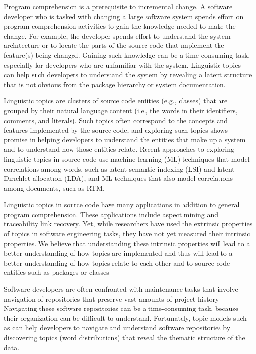 Program comprehension is a prerequisite to incremental change. A
software developer who is tasked with changing a large software system
spends effort on program comprehension activities to gain the knowledge
needed to make the change. For example, the developer
spends effort to understand the system architecture or to locate the
parts of the source code that implement the feature(s) being changed.
Gaining such knowledge can be a time-consuming task, especially for
developers who are unfamiliar with the system. Linguistic topics can
help such developers to understand the system by revealing a latent
structure that is not obvious from the package hierarchy or system
documentation.

Linguistic topics are clusters of source code entities (e.g., classes)
that are grouped by their natural language content (i.e., the words in
their identifiers, comments, and literals). Such topics often correspond
to the concepts and features implemented by the source
code, and exploring such topics shows promise in
helping developers to understand the entities that make up a system and
to understand how those entities
relate.
Recent approaches to exploring linguistic topics in source code use
machine learning (ML) techniques that model correlations among words,
such as latent semantic indexing (LSI) and
latent Dirichlet allocation (LDA), and ML techniques
that also model correlations among documents, such as
RTM.

Linguistic topics in source code have many applications in addition to
general program comprehension. These applications include aspect
mining and traceability link
recovery. Yet, while researchers have used the
extrinsic properties of topics in software engineering tasks, they have
not yet measured their intrinsic properties. We believe that
understanding these intrinsic properties will lead to a better
understanding of how topics are implemented and thus will lead to a
better understanding of how topics relate to each other and to source
code entities such as packages or classes.

Software developers are often confronted with maintenance tasks that
involve navigation of repositories that preserve vast amounts of project
history. Navigating these software repositories can be a time-consuming
task, because their organization can be difficult to understand.
Fortunately, topic models such as  can help developers to navigate and
understand software repositories by discovering topics (word
distributions) that reveal the thematic structure of the
data.

